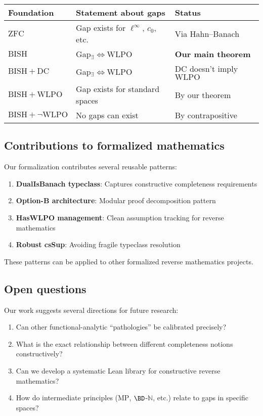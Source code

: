 \documentclass[11pt]{article}  %
\newcommand{\N}{\mathbb{N}}
\newcommand{\WLPO}{\mathrm{WLPO}}
\newcommand{\BISH}{\mathrm{BISH}}
\newcommand{\DC}{\mathrm{DC}}
\newcommand{\ZFC}{\mathrm{ZFC}}
\newcommand{\MP}{\mathrm{MP}}
\begin{document}
\begin{center}
\begin{tabular}{lll}
\toprule
Foundation & Statement about gaps & Status \\
\midrule
$\ZFC$ & Gap exists for $\ell^\infty$, $c_0$, etc. & Via Hahn--Banach \\
$\BISH$ & Gap$_{\exists} \Leftrightarrow \WLPO$ & \textbf{Our main theorem} \\
$\BISH+\DC$ & Gap$_{\exists} \Leftrightarrow \WLPO$ & $\DC$ doesn't imply $\WLPO$ \\
$\BISH+\WLPO$ & Gap exists for standard spaces & By our theorem \\
$\BISH+\neg\WLPO$ & No gaps can exist & By contrapositive \\
\bottomrule
\end{tabular}
\end{center}

\subsection{Contributions to formalized mathematics}

Our formalization contributes several reusable patterns:
\begin{enumerate}
\item \textbf{DualIsBanach typeclass}: Captures constructive completeness requirements
\item \textbf{Option-B architecture}: Modular proof decomposition pattern
\item \textbf{HasWLPO management}: Clean assumption tracking for reverse mathematics
\item \textbf{Robust csSup}: Avoiding fragile typeclass resolution
\end{enumerate}

These patterns can be applied to other formalized reverse mathematics projects.

\subsection{Open questions}

Our work suggests several directions for future research:
\begin{enumerate}
\item Can other functional-analytic ``pathologies'' be calibrated precisely?
\item What is the exact relationship between different completeness notions constructively?
\item Can we develop a systematic Lean library for constructive reverse mathematics?
\item How do intermediate principles ($\MP$, $\BD$-$\N$, etc.) relate to gaps in specific spaces?
\end{enumerate}
\end{document}
